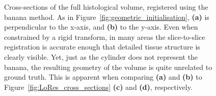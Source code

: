   \begin{figure}[htbp]
    \centering
    \caption{Cross-sections of the full histological volume, registered using the banana method. As in Figure~\ref{fig:geometric_initialisation}, \textbf{(a)} is perpendicular to the x-axis, and \textbf{(b)} to the y-axis. Even when constrained by a rigid transform, in many areas the slice-to-slice registration is accurate enough that detailed tissue structure is clearly visible. Yet, just as the cylinder does not represent the banana, the resulting geometry of the volume is quite unrelated to ground truth. This is apparent when comparing \textbf{(a)} and \textbf{(b)} to Figure~\ref{fig:LoRes_cross_sections} \textbf{(c)} and \textbf{(d)}, respectively.}
    \label{fig:banana}
  \end{figure}
    

